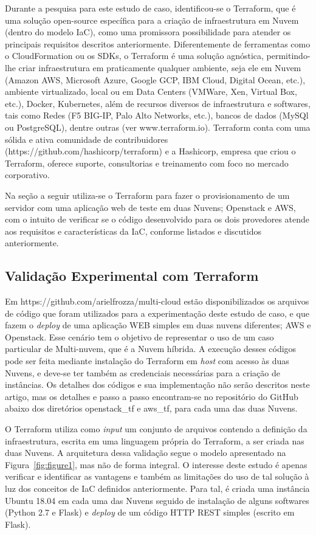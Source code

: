 \documentclass[12pt]{article}
\begin{document}
	Durante a pesquisa para este estudo de caso, identificou-se o Terraform, que é uma solução open-source específica para a criação de infraestrutura em Nuvem (dentro do modelo IaC), como uma promissora possibilidade para atender os principais requisitos descritos anteriormente. Diferentemente de ferramentas como o CloudFormation ou os SDKs, o Terraform é uma solução agnóstica, permitindo-lhe criar infraestrutura em praticamente qualquer ambiente, seja ele em Nuvem (Amazon AWS, Microsoft Azure, Google GCP, IBM Cloud, Digital Ocean, etc.), ambiente virtualizado, local ou em Data Centers (VMWare, Xen, Virtual Box, etc.), Docker, Kubernetes, além de recursos diversos de infraestrutura e softwares, tais como Redes (F5 BIG-IP, Palo Alto Networks, etc.), bancos de dados (MySQl ou PostgreSQL), dentre outras (ver www.terraform.io). Terraform conta com uma sólida e ativa comunidade de contribuidores (https://github.com/hashicorp/terraform) e a Hashicorp, empresa que criou o Terraform, oferece suporte, consultorias e treinamento com foco no mercado corporativo.
	
	Na seção a seguir utiliza-se o Terraform para fazer o provisionamento de um servidor com uma aplicação web de teste em duas Nuvens; Openstack e AWS, com o intuito de verificar se o código desenvolvido para os dois provedores atende aos requisitos e características da IaC, conforme listados e discutidos anteriormente.  
	
	\subsection{Validação Experimental com Terraform}
		
	Em https://github.com/arielfrozza/multi-cloud estão disponibilizados os arquivos de código que foram utilizados para a experimentação deste estudo de caso, e que fazem o \textit{deploy} de uma aplicação WEB simples em duas nuvens diferentes; AWS e Openstack. Esse cenário tem o objetivo de representar o uso de um caso particular de Multi-nuvem, que é a Nuvem híbrida. A execução desses códigos pode ser feita mediante instalação do Terraform em \textit{host} com acesso às duas Nuvens, e deve-se ter também as credenciais necessárias para a criação de instâncias. Os detalhes dos códigos e sua implementação não serão descritos neste artigo, mas os detalhes e passo a passo encontram-se no repositório do GitHub abaixo dos diretórios openstack\_tf e aws\_tf, para cada uma das duas Nuvens.
	
	O Terraform utiliza como \textit{input} um conjunto de arquivos contendo a definição da infraestrutura, escrita em uma linguagem própria do Terraform, a ser criada nas duas Nuvens. A arquitetura dessa validação segue o modelo apresentado na Figura~\ref{fig:figure1}, mas não de forma integral. O interesse deste estudo é apenas verificar e identificar as vantagens e também as limitações do uso de tal solução à luz dos conceitos de IaC definidos anteriormente. Para tal, é criada uma instância Ubuntu 18.04 em cada uma das Nuvens seguido de instalação de alguns softwares (Python 2.7 e Flask) e \textit{deploy} de um código HTTP REST simples (escrito em Flask).
	
\end{document}
